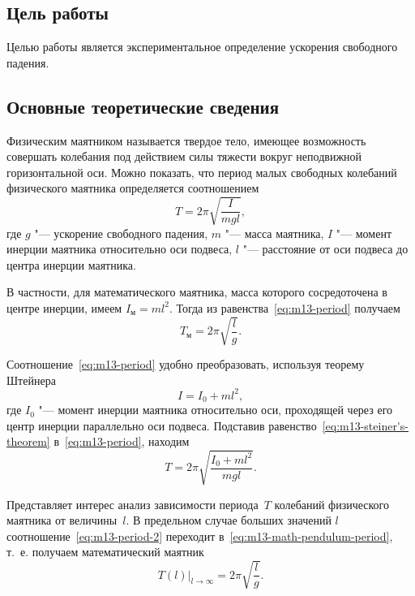 \documentclass[a4paper, 12pt]{extarticle}
\begin{document}
\MTDTitlePage
\MTDInfoPage

\setcounter{section}{13}

\subsection{Цель работы}
Целью работы является экспериментальное определение ускорения свободного падения.

\subsection{Основные теоретические сведения}
Физическим маятником называется твердое тело, имеющее возможность совершать колебания под действием силы тяжести вокруг неподвижной горизонтальной оси. Можно показать, что период малых свободных колебаний физического маятника определяется соотношением
\begin{equation}
\label{eq:m13-period}
T = 2 \pi \sqrt{\frac{I}{mgl}},
\end{equation}
где $g$ "--- ускорение свободного падения, $m$ "--- масса маятника, $I$ "--- момент инерции маятника относительно оси подвеса, $l$ "--- расстояние от оси подвеса до центра инерции маятника.

В частности, для математического маятника, масса которого сосредоточена в центре инерции, имеем $I_\text{м} = ml^2$. Тогда из равенства~\eqref{eq:m13-period} получаем
\begin{equation}
\label{eq:m13-math-pendulum-period}
T_\text{м} = 2 \pi \sqrt{\frac{l}{g}}.
\end{equation}

Соотношение~\eqref{eq:m13-period} удобно преобразовать, используя теорему
Штейнера
\begin{equation}
\label{eq:m13-steiner's-theorem}
I = I_0 + ml^2,
\end{equation}
где $I_0$ "--- момент инерции маятника относительно оси, проходящей через его центр инерции параллельно оси подвеса. Подставив равенство~\eqref{eq:m13-steiner's-theorem} в~\eqref{eq:m13-period}, находим
\begin{equation}
\label{eq:m13-period-2}
T = 2 \pi \sqrt{\frac{I_0 + ml^2}{mgl}}.
\end{equation}

Представляет интерес анализ зависимости периода~$T$ колебаний физического маятника от величины~$l$. В предельном случае больших значений $l$ соотношение~\eqref{eq:m13-period-2} переходит в~\eqref{eq:m13-math-pendulum-period}, т.~е. получаем математический маятник
\begin{equation}
\label{eq:m13-period-l-to-inf}
\left. T(l) \right|_{l \to \infty} = 2 \pi \sqrt{\frac{l}{g}}. %
\end{equation}
\end{document}
